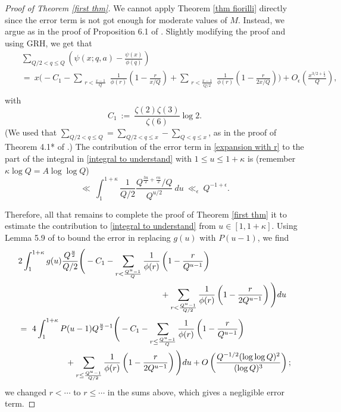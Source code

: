 \documentclass[12pt,reqno]{amsart}
\numberwithin{equation}{section}
\theoremstyle{plain}
\begin{document}
\begin{proof}[Proof of Theorem \ref{first thm}]
We cannot apply Theorem \ref{thm fiorilli} directly since the error term is not got enough for moderate values of $M$. Instead, we argue as in the proof of Proposition 6.1 of \cite{fiorilli}. Slightly modifying the proof and using GRH, we get that
\begin{eqnarray}\label{expansion with r}& & \sum_{Q/2 < q\leq Q} \left( \psi(x;q,a)-\frac{\psi(x)}{\phi(q)} \right) \nonumber\\ & & =\ x\Bigg(-C_1 -\sum_{\substack{r< \frac {x-1}{Q}}}\frac 1{\phi(r)} \left(1-\frac r{x/{Q}}\right)
+\sum_{\substack{r< \frac {x-1}{Q/2}}}\frac 1{\phi(r)} \left(1-\frac r{2x/Q}\right)  \Bigg)
+O_{\epsilon}\left(\frac{x^{3/2+\frac{\epsilon}2}}{Q} \right),  \nonumber\\
 \end{eqnarray}
with
\begin{equation}
\label{equation definition C_1}
C_1 \ :=\ \frac{ \zeta(2)\zeta(3)}{\zeta(6)} \log 2.
\end{equation}
(We used that $\sum_{Q/2 < q\leq Q} = \sum_{Q/2 < q\leq x} -\sum_{Q < q\leq x}$, as in the proof of Theorem 4.1* of \cite{fiorilli2}.)
The contribution of the error term in \eqref{expansion with r} to the part of the integral in \eqref{integral to understand} with $1\leq u\leq 1+\kappa$ is (remember $\kappa \log Q = A\log\log Q$)
\begin{equation} \ll\ \int_1^{1+\kappa}\frac{1}{Q/2} \frac{Q^{\frac{3u}2+\frac{\epsilon u}2} / Q}{Q^{u/2}}\ du\ \ll_{\epsilon}\ Q^{-1+ \epsilon}. \end{equation}

Therefore, all that remains to complete the proof of Theorem \ref{first thm} it to estimate the contribution to \eqref{integral to understand} from $u \in [1, 1+\kappa]$. Using Lemma 5.9 of \cite{fiorilli} to bound the error in replacing $g(u)$ with $P(u-1)$, we find
\begin{align}  &2\int_1^{1+\kappa}g(u) \frac{Q^{\frac{u}{2}}}{Q/2}\Bigg(-C_1-\sum_{\substack{r< \frac {Q^u-1}Q}}\frac 1{\phi(r)} \left(1-\frac r{Q^{u-1}}\right) \notag \\
&\hspace{6cm}+\sum_{\substack{r< \frac {Q^u-1}{Q/2}}}\frac 1{\phi(r)} \left(1-\frac r{2Q^{u-1}}\right)\Bigg)du \notag\\
 &=\ 4\int_1^{1+\kappa}P(u-1) Q^{\frac u2-1}\Bigg(-C_1-\sum_{\substack{r\leq \frac {Q^u-1}Q}}\frac 1{\phi(r)} \left(1-\frac r{Q^{u-1}}\right)\notag\\
&\hspace{2cm}+\sum_{\substack{r\leq \frac {Q^u-1}{Q/2}}}\frac 1{\phi(r)} \left(1-\frac r{2Q^{u-1}}\right)\Bigg)du +O\left( \frac{Q^{-1/2} (\log\log Q)^2}{(\log Q)^{3}}\right); \label{simple integral}
\end{align}
we changed $r<\cdots$ to $r\leq \cdots$ in the sums above, which gives a negligible error term.


\end{proof}
\end{document}
